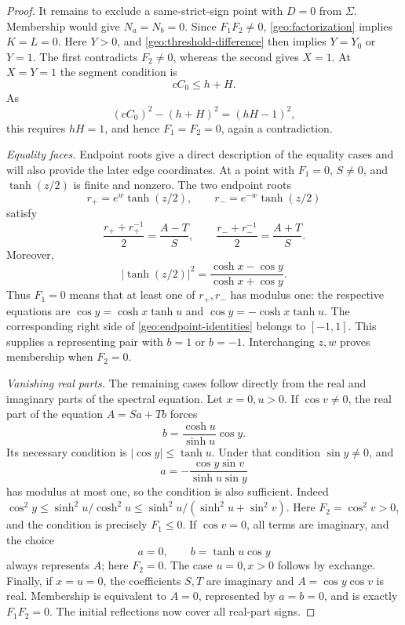 \documentclass[11pt]{article}
\numberwithin{equation}{section}
\theoremstyle{definition}
\begin{document}
\begin{proof}
It remains to exclude a same-strict-sign point with \(D=0\)
from \(\Sigma\).  Membership would give \(N_a=N_b=0\).
Since \(F_1F_2\ne0\), \eqref{geo:factorization} implies
\(K=L=0\).  Here \(Y>0\), and \eqref{geo:threshold-difference}
then implies \(Y=Y_0\) or \(Y=1\).  The first contradicts
\(F_2\ne0\), whereas the second gives \(X=1\).  At \(X=Y=1\)
the segment condition is
\[
                         cC_0\leq h+H.
\]
As
\[
                 (cC_0)^2-(h+H)^2=(hH-1)^2,
\]
this requires \(hH=1\), and hence \(F_1=F_2=0\), again a
contradiction.

\emph{Equality faces.} Endpoint roots give a direct description of
the equality cases and will also provide the later edge coordinates.
At a point with \(F_1=0\), \(S\ne0\), and
\(\tanh(z/2)\) is finite and nonzero.  The two endpoint roots
\begin{equation}\label{geo:endpoint-roots}
 r_+=e^w\tanh(z/2),\qquad r_-=e^{-w}\tanh(z/2)
\end{equation}
satisfy
\begin{equation}\label{geo:endpoint-identities}
 \frac{r_++r_+^{-1}}2=\frac{A-T}{S},\qquad
 \frac{r_-+r_-^{-1}}2=\frac{A+T}{S}.
\end{equation}
Moreover,
\begin{equation}\label{geo:tanh-modulus}
 |\tanh(z/2)|^2=\frac{\cosh x-\cos y}{\cosh x+\cos y}.
\end{equation}
Thus \(F_1=0\) means that at least one of \(r_+,r_-\) has
modulus one: the respective equations are
\(\cos y=\cosh x\tanh u\) and
\(\cos y=-\cosh x\tanh u\).  The corresponding right side
of \eqref{geo:endpoint-identities} belongs to \([-1,1]\).
This supplies a representing pair with \(b=1\) or \(b=-1\).
Interchanging \(z,w\) proves membership when \(F_2=0\).

\emph{Vanishing real parts.} The remaining cases follow directly from the real and imaginary
parts of the spectral equation.  Let \(x=0,u>0\).  If \(\cos v\ne0\),
the real part of the equation \(A=Sa+Tb\) forces
\[
 b=\frac{\cosh u}{\sinh u}\cos y.
\]
Its necessary condition is \(|\cos y|\leq\tanh u\).
Under that condition \(\sin y\ne0\), and
\[
 a=-\frac{\cos y\sin v}{\sinh u\sin y}
\]
has modulus at most one, so the condition is also sufficient.
Indeed
\(\cos^2y\leq\sinh^2u/\cosh^2u
\leq\sinh^2u/(\sinh^2u+\sin^2v)\).
Here \(F_2=\cos^2v>0\), and the condition is precisely \(F_1\leq0\).
If \(\cos v=0\), all terms are imaginary, and the choice
\[
                 a=0,\qquad b=\tanh u\cos y
\]
always represents \(A\); here \(F_2=0\).
The case \(u=0,x>0\) follows by exchange.  Finally, if \(x=u=0\),
the coefficients \(S,T\) are imaginary and \(A=\cos y\cos v\)
is real.  Membership is equivalent to \(A=0\), represented by
\(a=b=0\), and is exactly \(F_1F_2=0\).
The initial reflections now cover all real-part signs.
\end{proof}
\end{document}
